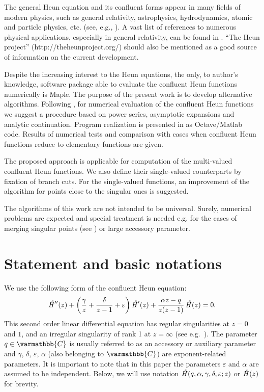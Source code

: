 \documentclass[11pt]{article}
\newcommand{\MF}[1]{\mathop{#1}\nolimits}
\newcommand{\Cb}{\varmathbb{C}}%
\def\HeunC{\displaystyle\setbox0=\hbox{\tiny\itshape\bfseries \kern1.52mm c}\wd0=0pt\ht0=0pt\dp0=0pt\MF{\textit{\hbox{\raise1.67ex\copy0}H\/}}}%
\begin{document}
The general Heun equation and its confluent forms appear in many fields of modern physics, such as 
general relativity, astrophysics, hydrodynamics, atomic and particle physics, etc. (see, e.g., \cite{CunhaChristiansen2011,FizievStaicova2011,RenziSammarco2016,VieiraBezerra2016,ZhangJinJinXie2016,BirkandanHortacsu2017,HartmannPortnoi2017}).
 A vast list of references to numerous physical applications, especially in general relativity, can be found in \cite{Hortacsu2017}.
``The Heun project'' (http://theheunproject.org/) should also be mentioned as a good source of information on the current development.  

Despite the increasing interest to the Heun equations, the only, to author's knowledge, software package able to evaluate the confluent Heun functions numerically is Maple{\footnotesize\texttrademark}. The purpose of the present work is to develop alternative algorithms. Following \cite{Mot15}, for numerical evaluation of the confluent Heun functions we suggest a procedure based on power series, asymptotic expansions and analytic continuation. Program realization is presented in \cite{mycode2} as Octave/Matlab code. Results of numerical tests and comparison with cases when confluent Heun functions reduce to elementary functions are given.

The proposed approach is applicable for computation of the multi-valued confluent Heun functions. We also define their single-valued counterparts by fixation of branch cuts. For the single-valued functions, an improvement of the algorithm for points close to the singular ones is suggested.

The algorithms of this work are not intended to be universal. Surely, numerical problems are expected and special treatment is needed e.g. for the cases of merging singular points (see \cite{LaySlavyanov1999}) or large accessory parameter.

\section{Statement and basic notations} 
\label{sect:statement}

We use the following form of the confluent Heun equation:
\begin{equation}
  \MF{\HeunC''}(z)+\left(\frac{\gamma}{z}+\frac{\delta}{z-1}+\varepsilon\right)\MF{\HeunC'}(z)+
  \frac{\alpha z-q}{z(z-1)}\MF{\HeunC}(z)=0.
\label{eq:HeunC}
\end{equation}
This second order linear differential equation has regular singularities at $z = 0$ and $1$, and an irregular singularity of rank 1 at $z = \infty$ (see e.g.\ \cite{SlavyanovLay2000}).
The parameter $q\in\Cb$ is usually referred to as an accessory or
auxiliary parameter and $\gamma$, $\delta$, $\varepsilon$, $\alpha$
(also belonging to $\Cb$) are exponent-related parameters.
It is important to note that in this paper the parameters $\varepsilon$ and $\alpha$ are assumed to
be independent. Below, we will use notation $\HeunC(q,\alpha,\gamma,\delta,\varepsilon;z)$ or $\HeunC(z)$ for brevity.
\end{document}
